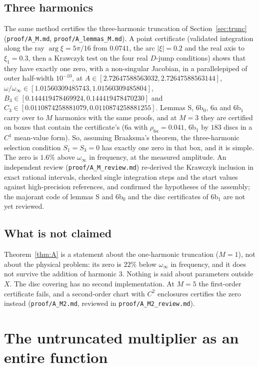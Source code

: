 \documentclass{amsart}
\numberwithin{equation}{section}
\theoremstyle{plain}
\theoremstyle{definition}
\theoremstyle{remark}
\newcommand{\winf}{\omega_\infty}
\newcommand{\repo}[1]{\texttt{#1}}
\begin{document}
\subsection{Three harmonics}\label{sec:A3}
The same method certifies the three-harmonic truncation of Section~\ref{sec:trunc} (\repo{proof/A\_M.md},
\repo{proof/A\_lemmas\_M.md}). A point certificate (validated integration along the ray $\arg\xi = 5\pi/16$ from $0.0741$,
the arc $|\xi| = 0.2$ and the real axis to $\xi_1 = 0.3$, then a Krawczyk test on the four real $D$-jump conditions) shows
that they have exactly one zero, with a non-singular Jacobian, in a parallelepiped of outer half-width $10^{-10}$, at
$A \in [2.72647588563032, 2.72647588563144]$, $\omega/\winf \in [1.01560309485743, 1.01560309485804]$,
$B_3 \in [0.144419478469924, 0.144419478470230]$ and $C_3 \in [0.0110874258881079, 0.0110874258881255]$. Lemmas S,
6b$_0$, 6a and 6b$_1$ carry over to $M$ harmonics with the same proofs, and at $M = 3$ they are certified on boxes that
contain the certificate's (6a with $\rho_{6a} = 0.041$, 6b$_1$ by $183$ discs in a $C^1$ mean-value form). So, assuming
Braaksma's theorem, the three-harmonic selection condition $S_1 = S_3 = 0$ has exactly one zero in that box, and it is
simple. The zero is $1.6\%$ above $\winf$ in frequency, at the measured amplitude. An independent review (\repo{proof/A\_M\_review.md}) re-derived the
Krawczyk inclusion in exact rational intervals, checked single integration steps and the start values against
high-precision references, and confirmed the hypotheses of the assembly; the majorant code of lemmas S and 6b$_0$ and the
disc certificates of 6b$_1$ are not yet reviewed.

\subsection{What is not claimed}
Theorem~\ref{thm:A} is a statement about the one-harmonic truncation ($M = 1$), not about the physical problem: its zero is
$22\%$ below $\winf$ in frequency, and it does not survive the addition of harmonic $3$. Nothing is said about parameters outside
$X$. The disc covering has no second implementation. At $M = 5$ the first-order certificate fails, and a second-order chart
with $C^2$ enclosures certifies the zero instead (\repo{proof/A\_M2.md}, reviewed in \repo{proof/A\_M2\_review.md}).

\section{The untruncated multiplier as an entire function}
\label{sec:entire}
\end{document}

